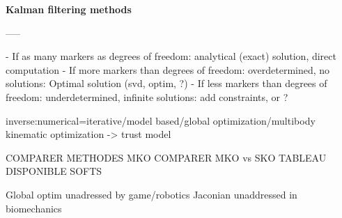 \vspace*{0.5cm}
\noindent\textbf{Kalman filtering methods}


-----




- If as many markers as degrees of freedom: analytical (exact) solution, direct computation
- If more markers than degrees of freedom: overdetermined, no solutions: Optimal solution (svd, optim, ?)
- If less markers than degrees of freedom: underdetermined, infinite solutions: add constraints, or ?



inverse:numerical=iterative/model based/global optimization/multibody kinematic optimization
-> trust model


COMPARER METHODES MKO
COMPARER MKO vs SKO
TABLEAU DISPONIBLE SOFTS


Global optim unadressed by game/robotics
Jaconian unaddressed in biomechanics







